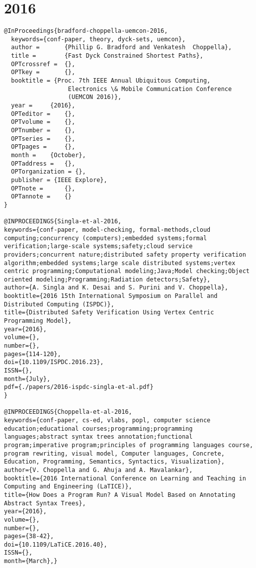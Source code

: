 \documentclass[11pt]{article}
\begin{document}
\section{2016}
\label{sec:orgfc6e4a1}
\lstset{language=bibtex,label= ,caption= ,captionpos=b,numbers=none}
\begin{lstlisting}
@InProceedings{bradford-choppella-uemcon-2016,
  keywords={conf-paper, theory, dyck-sets, uemcon},
  author = 		 {Phillip G. Bradford and Venkatesh  Choppella},
  title = 		 {Fast Dyck Constrained Shortest Paths},
  OPTcrossref =  {},
  OPTkey = 		 {},
  booktitle = {Proc. 7th IEEE Annual Ubiquitous Computing,
                  Electronics \& Mobile Communication Conference
                  (UEMCON 2016)},
  year = 	 {2016},
  OPTeditor = 	 {},
  OPTvolume = 	 {},
  OPTnumber = 	 {},
  OPTseries = 	 {},
  OPTpages = 	 {},
  month = 	 {October},
  OPTaddress = 	 {},
  OPTorganization = {},
  publisher = {IEEE Explore},
  OPTnote = 	 {},
  OPTannote = 	 {}
}

@INPROCEEDINGS{Singla-et-al-2016, 
keywords={conf-paper, model-checking, formal-methods,cloud computing;concurrency (computers);embedded systems;formal verification;large-scale systems;safety;cloud service providers;concurrent nature;distributed safety property verification algorithm;embedded systems;large scale distributed systems;vertex centric programming;Computational modeling;Java;Model checking;Object oriented modeling;Programming;Radiation detectors;Safety},
author={A. Singla and K. Desai and S. Purini and V. Choppella}, 
booktitle={2016 15th International Symposium on Parallel and Distributed Computing (ISPDC)}, 
title={Distributed Safety Verification Using Vertex Centric Programming Model}, 
year={2016}, 
volume={}, 
number={}, 
pages={114-120}, 
doi={10.1109/ISPDC.2016.23}, 
ISSN={}, 
month={July},
pdf={./papers/2016-ispdc-singla-et-al.pdf}
}

@INPROCEEDINGS{Choppella-et-al-2016,
keywords={conf-paper, cs-ed, vlabs, popl, computer science education;educational courses;programming;programming languages;abstract syntax trees annotation;functional program;imperative program;principles of programming languages course, program rewriting, visual model, Computer languages, Concrete, Education, Programming, Semantics, Syntactics, Visualization},
author={V. Choppella and G. Ahuja and A. Mavalankar}, 
booktitle={2016 International Conference on Learning and Teaching in Computing and Engineering (LaTICE)}, 
title={How Does a Program Run? A Visual Model Based on Annotating Abstract Syntax Trees}, 
year={2016}, 
volume={}, 
number={}, 
pages={38-42}, 
doi={10.1109/LaTiCE.2016.40}, 
ISSN={}, 
month={March},}
\end{lstlisting}
\end{document}
